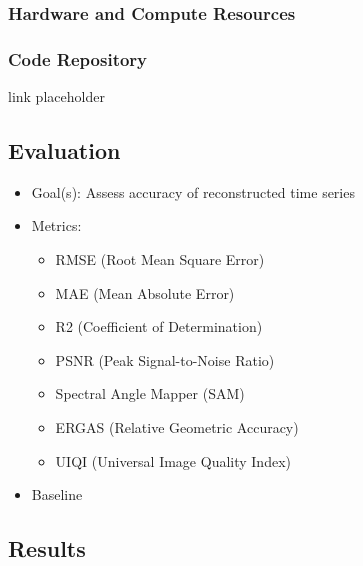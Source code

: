 \begin{multicols}{2}
\subsubsection{Hardware and Compute Resources}
\subsubsection{Code Repository}
link placeholder

\subsection{Evaluation}
    \begin{itemize}
        \item Goal(s): Assess accuracy of reconstructed time series 
        \item Metrics:
        \begin{itemize}
            \item RMSE (Root Mean Square Error)
            \item MAE (Mean Absolute Error)
            \item R2 (Coefficient of Determination)
            \item PSNR (Peak Signal-to-Noise Ratio)
            \item Spectral Angle Mapper (SAM)
            \item ERGAS (Relative Geometric Accuracy)
            \item UIQI (Universal Image Quality Index)
        \end{itemize}
        \item Baseline 
    \end{itemize}

\subsection{Results}

\end{multicols}
\bigskip